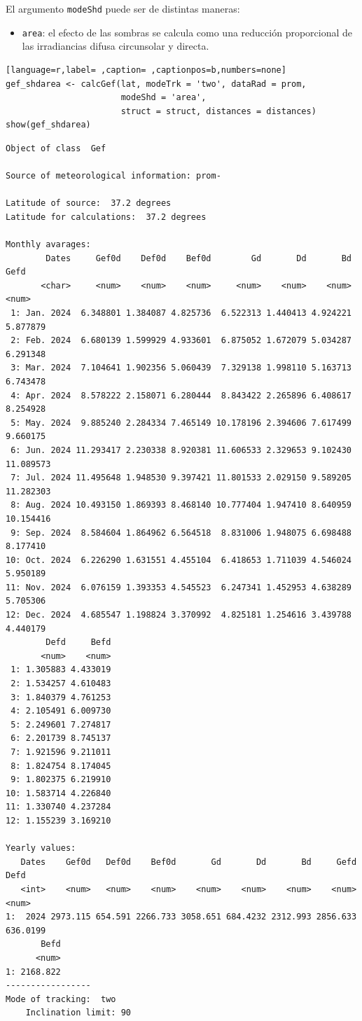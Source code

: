 El argumento \texttt{modeShd} puede ser de distintas maneras:
\begin{itemize}
\item \texttt{area}: el efecto de las sombras se calcula como una reducción proporcional de las irradiancias difusa circunsolar y directa.
\end{itemize}
\begin{lstlisting}[language=r,label= ,caption= ,captionpos=b,numbers=none]
gef_shdarea <- calcGef(lat, modeTrk = 'two', dataRad = prom,
                       modeShd = 'area',
                       struct = struct, distances = distances)
show(gef_shdarea)
\end{lstlisting}

\begin{verbatim}
Object of class  Gef 

Source of meteorological information: prom- 

Latitude of source:  37.2 degrees
Latitude for calculations:  37.2 degrees

Monthly avarages:
        Dates     Gef0d    Def0d    Bef0d        Gd       Dd       Bd      Gefd
       <char>     <num>    <num>    <num>     <num>    <num>    <num>     <num>
 1: Jan. 2024  6.348801 1.384087 4.825736  6.522313 1.440413 4.924221  5.877879
 2: Feb. 2024  6.680139 1.599929 4.933601  6.875052 1.672079 5.034287  6.291348
 3: Mar. 2024  7.104641 1.902356 5.060439  7.329138 1.998110 5.163713  6.743478
 4: Apr. 2024  8.578222 2.158071 6.280444  8.843422 2.265896 6.408617  8.254928
 5: May. 2024  9.885240 2.284334 7.465149 10.178196 2.394606 7.617499  9.660175
 6: Jun. 2024 11.293417 2.230338 8.920381 11.606533 2.329653 9.102430 11.089573
 7: Jul. 2024 11.495648 1.948530 9.397421 11.801533 2.029150 9.589205 11.282303
 8: Aug. 2024 10.493150 1.869393 8.468140 10.777404 1.947410 8.640959 10.154416
 9: Sep. 2024  8.584604 1.864962 6.564518  8.831006 1.948075 6.698488  8.177410
10: Oct. 2024  6.226290 1.631551 4.455104  6.418653 1.711039 4.546024  5.950189
11: Nov. 2024  6.076159 1.393353 4.545523  6.247341 1.452953 4.638289  5.705306
12: Dec. 2024  4.685547 1.198824 3.370992  4.825181 1.254616 3.439788  4.440179
        Defd     Befd
       <num>    <num>
 1: 1.305883 4.433019
 2: 1.534257 4.610483
 3: 1.840379 4.761253
 4: 2.105491 6.009730
 5: 2.249601 7.274817
 6: 2.201739 8.745137
 7: 1.921596 9.211011
 8: 1.824754 8.174045
 9: 1.802375 6.219910
10: 1.583714 4.226840
11: 1.330740 4.237284
12: 1.155239 3.169210

Yearly values:
   Dates    Gef0d   Def0d    Bef0d       Gd       Dd       Bd     Gefd     Defd
   <int>    <num>   <num>    <num>    <num>    <num>    <num>    <num>    <num>
1:  2024 2973.115 654.591 2266.733 3058.651 684.4232 2312.993 2856.633 636.0199
       Befd
      <num>
1: 2168.822
-----------------
Mode of tracking:  two 
    Inclination limit: 90
\end{verbatim}

